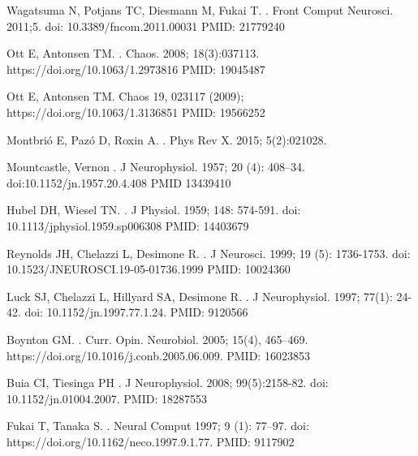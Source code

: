 \documentclass[10pt,letterpaper]{article}
\begin{document}
\begin{thebibliography}{10}
Wagatsuma N, Potjans TC, Diesmann M, Fukai T.
.
\newblock Front Comput Neurosci. 2011;5. doi: 10.3389/fncom.2011.00031 PMID: 21779240

Ott E, Antonsen TM.
.
\newblock Chaos. 2008; 18(3):037113. https://doi.org/10.1063/1.2973816 PMID: 19045487

Ott E, Antonsen TM.
\newblock Chaos 19, 023117 (2009); https://doi.org/10.1063/1.3136851 PMID: 19566252

Montbrió E, Pazó D, Roxin A.
.
\newblock Phys Rev X. 2015; 5(2):021028.

Mountcastle, Vernon
.
\newblock J Neurophysiol. 1957; 20 (4): 408–34. doi:10.1152/jn.1957.20.4.408 PMID 13439410

Hubel DH, Wiesel TN.
.
\newblock J Physiol. 1959; 148: 574-591. doi: 10.1113/jphysiol.1959.sp006308 PMID: 14403679

Reynolds JH, Chelazzi L, Desimone R.
.
\newblock J Neurosci. 1999; 19 (5): 1736-1753. doi: 10.1523/JNEUROSCI.19-05-01736.1999 PMID: 10024360

Luck SJ, Chelazzi L, Hillyard SA, Desimone R.
.
\newblock J Neurophysiol. 1997; 77(1): 24-42. doi: 10.1152/jn.1997.77.1.24. PMID: 9120566

Boynton GM.
.
\newblock Curr. Opin. Neurobiol. 2005; 15(4), 465–469. https://doi.org/10.1016/j.conb.2005.06.009. PMID: 16023853

Buia CI, Tiesinga PH
.
\newblock J Neurophysiol. 2008; 99(5):2158-82. doi: 10.1152/jn.01004.2007. PMID: 18287553

Fukai T, Tanaka S.
.
\newblock Neural Comput 1997; 9 (1): 77–97. doi: https://doi.org/10.1162/neco.1997.9.1.77. PMID: 9117902


\end{thebibliography}
\end{document}

